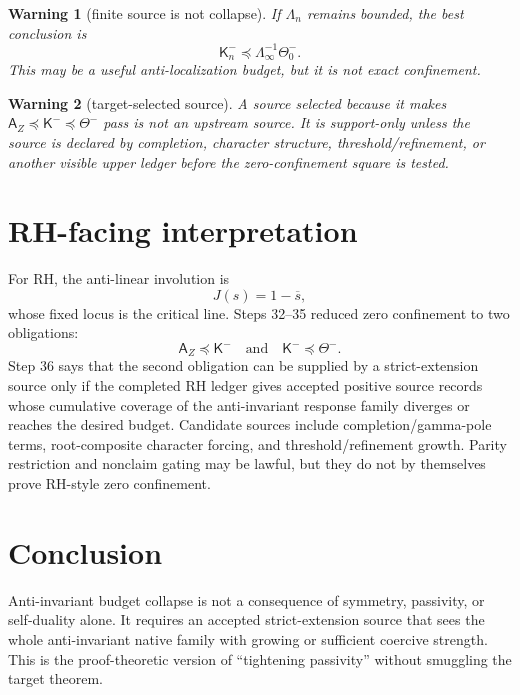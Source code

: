 \documentclass[11pt]{article}
\newtheorem{warning}{Warning}
\begin{document}
\begin{warning}[finite source is not collapse]
If \(\Lambda_n\) remains bounded, the best conclusion is
\[
  \mathsf K_n^-
  \preceq \Lambda_\infty^{-1}\Theta_0^-.
\]
This may be a useful anti-localization budget, but it is not exact confinement.
\end{warning}

\begin{warning}[target-selected source]
A source selected because it makes \(\mathsf A_Z\preceq\mathsf K^-\preceq\Theta^-\) pass is not an upstream source.  It is support-only unless the source is declared by completion, character structure, threshold/refinement, or another visible upper ledger before the zero-confinement square is tested.
\end{warning}

\section{RH-facing interpretation}
For RH, the anti-linear involution is
\[
  J(s)=1-\overline{s},
\]
whose fixed locus is the critical line.  Steps 32--35 reduced zero confinement to two obligations:
\[
  \mathsf A_Z\preceq\mathsf K^-\quad\text{and}\quad \mathsf K^-\preceq\Theta^-.
\]
Step 36 says that the second obligation can be supplied by a strict-extension source only if the completed RH ledger gives accepted positive source records whose cumulative coverage of the anti-invariant response family diverges or reaches the desired budget.  Candidate sources include completion/gamma-pole terms, root-composite character forcing, and threshold/refinement growth.  Parity restriction and nonclaim gating may be lawful, but they do not by themselves prove RH-style zero confinement.

\section{Conclusion}
Anti-invariant budget collapse is not a consequence of symmetry, passivity, or self-duality alone.  It requires an accepted strict-extension source that sees the whole anti-invariant native family with growing or sufficient coercive strength.  This is the proof-theoretic version of ``tightening passivity'' without smuggling the target theorem.
\end{document}
